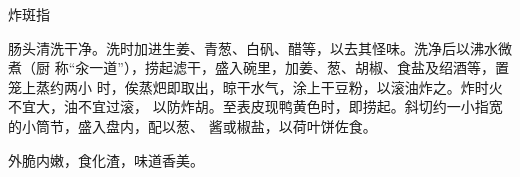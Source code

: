 \begin{recipe}{炸斑指}

\ingredients


\preparation

肠头清洗干净。洗时加进生姜、青葱、白矾、醋等，以去其怪味。洗净后以沸水微煮（厨
称“汆一道”），捞起滤干，盛入碗里，加姜、葱、胡椒、食盐及绍酒等，置笼上蒸约两小
时，俟蒸𤆵即取出，晾干水气，涂上干豆粉，以滚油炸之。炸时火不宜大，油不宜过滚，
以防炸胡。至表皮现鸭黄色时，即捞起。斜切约一小指宽的小筒节，盛入盘内，配以葱、
酱或椒盐，以荷叶饼佐食。

\features

外脆内嫩，食化渣，味道香美。

\end{recipe}


